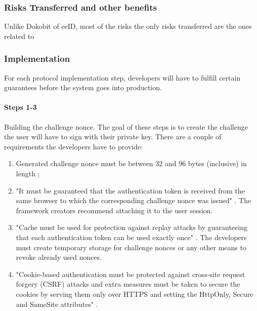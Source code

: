 
\subsubsection{Risks Transferred and other benefits}

Unlike Dokobit of eeID, most of the risks the only risks transferred are the ones related to 


\subsubsection{Implementation}

For each protocol implementation step, developers will have to fulfill certain guarantees before the system goes into production.

\paragraph{Steps 1-3}

Building the challenge nonce. The goal of these steps is to create the challenge the user will have to sign with their private key. There are a couple of requirements the developers have to provide:
\begin{enumerate}
    \item Generated challenge nonce must be between 32 and 96 bytes (inclusive) in length \cite{ria-webeid-source-web-eid-app-authenticate};
    \item "It must be guaranteed that the authentication token is received from the same browser to which the corresponding challenge nonce was issued" \cite{ria-webeid-source-web-eid-authtoken-validation-java-readme}. The framework creators recommend attaching it to the user session.
    \item "Cache must be used for protection against replay attacks by guaranteeing that each authentication token can be used exactly once" \cite{ria-webeid-source-web-eid-authtoken-validation-java-readme}. The developers must create temporary storage for challenge nonces or any other means to revoke already used nonces.
    \item "Cookie-based authentication must be protected against cross-site request forgery (CSRF) attacks and extra measures must be taken to secure the cookies by serving them only over HTTPS and setting the HttpOnly, Secure and SameSite attributes" \cite{ria-webeid-source-web-eid-authtoken-validation-java-readme}.
\end{enumerate}

